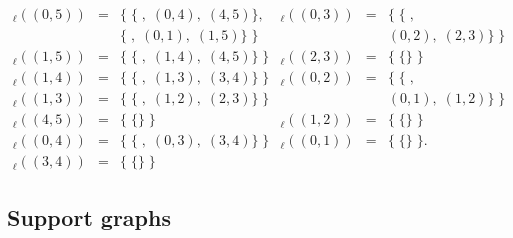 \documentclass[english]{jnlp_1.4_rep}
\newcommand{\q}{}
\newcommand{\sym}[1]{}
\newcommand{\dto}{}
\newcommand{\subtrees}{}
\begin{document}
{\small
\[
\begin{array}{lll|lll}
\subtrees_\ell(\sym{S}(0,5))&=&
		\{\;
		\{\sym{S}\dto\sym{PP}\;\sym{V},\;
					\sym{PP}(0,4),\;\sym{V}(4,5)\},&
	\subtrees_\ell(\sym{NP}(0,3))&=&
		\{\;\{\sym{NP}\dto\sym{VP}\;\sym{N},\\
&&\q\{\sym{S}\dto\sym{ADV}\;\sym{VP},\;
		\sym{ADV}(0,1),\;\sym{VP}(1,5)\}\;\}&
	&&\q\sym{VP}(0,2),\;\sym{N}(2,3)\}\;\}\\
\subtrees_\ell(\sym{VP}(1,5))&=&
		\{\;\{\sym{VP}\dto\sym{PP}\;\sym{V},\;
				\sym{PP}(1,4),\;\sym{V}(4,5)\}\;\}&
	\subtrees_\ell(\sym{N}(2,3))&=&
		\{\;\{\sym{N}\dto\sym{一郎}\}\;\}\\
\subtrees_\ell(\sym{PP}(1,4))&=&
		\{\;\{\sym{PP}\dto\sym{NP}\;\sym{P},\;
				\sym{NP}(1,3),\;\sym{P}(3,4)\}\;\}&
	\subtrees_\ell(\sym{VP}(0,2))&=&
		\{\;\{\sym{VP}\dto\sym{ADV}\;\sym{V},\\
\subtrees_\ell(\sym{NP}(1,3))&=&
		\{\;\{\sym{NP}\dto\sym{V}\;\sym{N},\;
				\sym{NP}(1,2),\;\sym{N}(2,3)\}\;\}&
		&&\q\sym{ADV}(0,1),\;\sym{V}(1,2)\}\;\}\\
\subtrees_\ell(\sym{V}(4,5))&=&
		\{\;\{\sym{V}\dto\sym{見た}\}\;\}&
	\subtrees_\ell(\sym{V}(1,2))&=&
			\{\;\{\sym{V}\dto\sym{走る}\}\;\}\\
\subtrees_\ell(\sym{PP}(0,4))&=&
		\{\;\{\sym{PP}\dto\sym{NP}\;\sym{P},\;
				\sym{NP}(0,3),\;\sym{P}(3,4)\}\;\}&
	\subtrees_\ell(\sym{ADV}(0,1))&=&
		\{\;\{\sym{ADV}\dto\sym{急いで}\}\;\}.\\
\subtrees_\ell(\sym{P}(3,4))&=&
	\{\;\{\sym{P}\dto\sym{を}\}\;\}
\end{array}
\]
}


\subsection{Support graphs}
\label{sec:GEM:support-graph}
\end{document}
